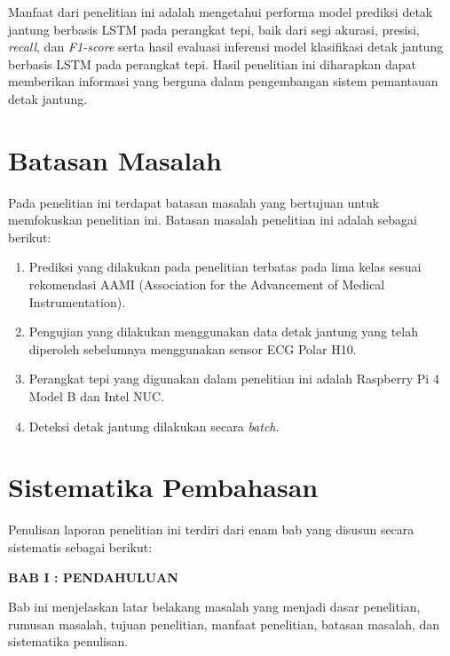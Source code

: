 Manfaat dari penelitian ini adalah mengetahui performa model prediksi detak jantung berbasis LSTM pada perangkat tepi, baik dari segi akurasi, presisi, \emph{recall}, dan \emph{F1-score} serta hasil evaluasi inferensi model klasifikasi detak jantung berbasis LSTM pada perangkat tepi.
Hasil penelitian ini diharapkan dapat memberikan informasi yang berguna dalam pengembangan sistem pemantauan detak jantung.


\section{Batasan Masalah}

Pada penelitian ini terdapat batasan masalah yang bertujuan untuk memfokuskan penelitian ini. Batasan masalah penelitian ini adalah sebagai berikut:
\begin{enumerate}
  \item Prediksi yang dilakukan pada penelitian terbatas pada lima kelas sesuai rekomendasi AAMI (Association for the Advancement of Medical Instrumentation).
  \item Pengujian yang dilakukan menggunakan data detak jantung yang telah diperoleh sebelumnya menggunakan sensor ECG Polar H10.
  \item Perangkat tepi yang digunakan dalam penelitian ini adalah Raspberry Pi 4 Model B dan Intel NUC.
  \item Deteksi detak jantung dilakukan secara \textit{batch}.
\end{enumerate}




\section{Sistematika Pembahasan}

Penulisan laporan penelitian ini terdiri dari enam bab yang disusun secara sistematis sebagai berikut:

\noindent
\textbf{BAB I : PENDAHULUAN}

Bab ini menjelaskan latar belakang masalah yang menjadi dasar penelitian, rumusan masalah, tujuan penelitian, manfaat penelitian, batasan masalah, dan sistematika penulisan.\\

